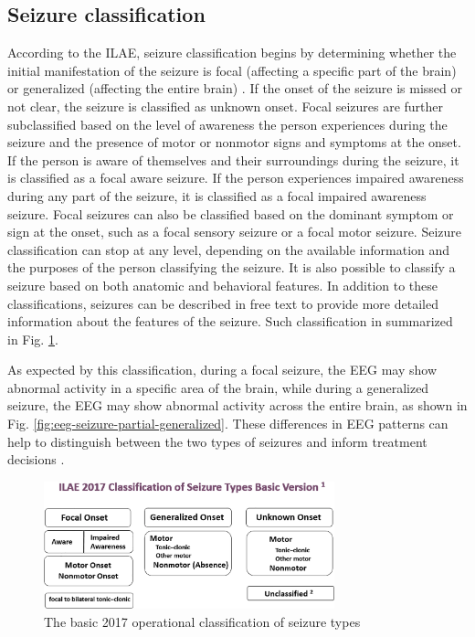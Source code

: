 \subsection{Seizure classification}

According to the \gls{ILAE}, seizure classification begins by determining whether the initial manifestation of the seizure is focal (affecting a specific part of the brain) or generalized (affecting the entire brain) \cite{fisher_instruction_2017, fisher_operational_2017}. If the onset of the seizure is missed or not clear, the seizure is classified as unknown onset. Focal seizures are further subclassified based on the level of awareness the person experiences during the seizure and the presence of motor or nonmotor signs and symptoms at the onset. If the person is aware of themselves and their surroundings during the seizure, it is classified as a focal aware seizure. If the person experiences impaired awareness during any part of the seizure, it is classified as a focal impaired awareness seizure. Focal seizures can also be classified based on the dominant symptom or sign at the onset, such as a focal sensory seizure or a focal motor seizure. Seizure classification can stop at any level, depending on the available information and the purposes of the person classifying the seizure. It is also possible to classify a seizure based on both anatomic and behavioral features. In addition to these classifications, seizures can be described in free text to provide more detailed information about the features of the seizure. Such classification in summarized in Fig. \ref{fig:ILAE-seizure-types}.

As expected by this classification, during a focal seizure, the EEG may show abnormal activity in a specific area of the brain, while during a generalized seizure, the EEG may show abnormal activity across the entire brain, as shown in Fig. \ref{fig:eeg-seizure-partial-generalized}. These differences in EEG patterns can help to distinguish between the two types of seizures and inform treatment decisions \cite{raga_electroclinical_2021}.


\begin{figure}[t]
    \centering
    \includegraphics[width=0.75\textwidth]{images/State-of-art/ILAE-seizure-types.png}
    \caption{The basic  2017 operational classification of seizure types \cite{fisher_instruction_2017, fisher_operational_2017}}
    \label{fig:ILAE-seizure-types}
\end{figure}

